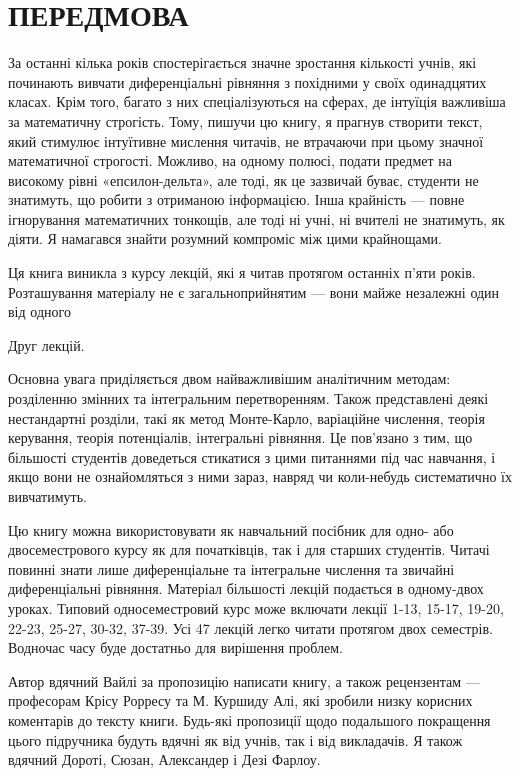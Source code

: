 \documentclass[
  ukrainian,
]{article}
\begin{document}
\section{ПЕРЕДМОВА}\label{ux43fux435ux440ux435ux434ux43cux43eux432ux430}

За останні кілька років спостерігається значне зростання кількості
учнів, які починають вивчати диференціальні рівняння з похідними у своїх
одинадцятих класах. Крім того, багато з них спеціалізуються на сферах,
де інтуїція важливіша за математичну строгість. Тому, пишучи цю книгу, я
прагнув створити текст, який стимулює інтуїтивне мислення читачів, не
втрачаючи при цьому значної математичної строгості. Можливо, на одному
полюсі, подати предмет на високому рівні «епсилон-дельта», але тоді, як
це зазвичай буває, студенти не знатимуть, що робити з отриманою
інформацією. Інша крайність --- повне ігнорування математичних тонкощів,
але тоді ні учні, ні вчителі не знатимуть, як діяти. Я намагався знайти
розумний компроміс між цими крайнощами.

Ця книга виникла з курсу лекцій, які я читав протягом останніх п'яти
років. Розташування матеріалу не є загальноприйнятим --- вони майже
незалежні один від одного

Друг лекцій.

Основна увага приділяється двом найважливішим аналітичним методам:
розділенню змінних та інтегральним перетворенням. Також представлені
деякі нестандартні розділи, такі як метод Монте-Карло, варіаційне
числення, теорія керування, теорія потенціалів, інтегральні рівняння. Це
пов'язано з тим, що більшості студентів доведеться стикатися з цими
питаннями під час навчання, і якщо вони не ознайомляться з ними зараз,
навряд чи коли-небудь систематично їх вивчатимуть.

Цю книгу можна використовувати як навчальний посібник для одно- або
двосеместрового курсу як для початківців, так і для старших студентів.
Читачі повинні знати лише диференціальне та інтегральне числення та
звичайні диференціальні рівняння. Матеріал більшості лекцій подається в
одному-двох уроках. Типовий односеместровий курс може включати лекції
1-13, 15-17, 19-20, 22-23, 25-27, 30-32, 37-39. Усі 47 лекцій легко
читати протягом двох семестрів. Водночас часу буде достатньо для
вирішення проблем.

Автор вдячний Вайлі за пропозицію написати книгу, а також рецензентам
--- професорам Крісу Рорресу та М. Куршиду Алі, які зробили низку
корисних коментарів до тексту книги. Будь-які пропозиції щодо подальшого
покращення цього підручника будуть вдячні як від учнів, так і від
викладачів. Я також вдячний Дороті, Сюзан, Александер і Дезі Фарлоу.
\end{document}
